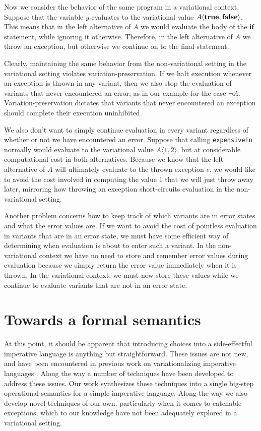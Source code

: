 \documentclass[12pt,oneside]{book}
\newcommand{\tagtree}[3]{#1 \langle #2, #3 \rangle}
\begin{document}
Now we consider the behavior of the same program in a variational context.
Suppose that the variable $y$ evaluates to the variational value
$\tagtree{A}{\CCkeyw{true}}{\CCkeyw{false}}$. This means that in the left alternative of $A$ we
would evaluate the body of the $\textbf{\textup{\textrm{if}}}$ statement, while ignoring it otherwise. Therefore,
in the left alternative of $A$ we throw an exception, but otherwise we continue on to the
final statement.

Clearly, maintaining the same behavior from the non-variational setting in the variational setting
violates variation-preservation. If we halt execution whenever an exception is
thrown in any variant, then we also stop the evaluation of variants that never encountered an error,
as in our example for the case $\neg A$. Variation-preservation dictates that variants that never encountered
an exception should complete their execution uninhibited.

We also don't want to simply continue evaluation
in every variant regardless of whether or not we have encountered an error.
Suppose that calling \texttt{expensiveFn} normally would evaluate to the variational value $\tagtree{A}{1}{2}$, but at considerable computational cost in both alternatives.
Because we know that the left alternative of $A$ will ultimately evaluate to the thrown exception $e$, we would
like to avoid the cost involved in computing the value $1$ that we will just throw away later, mirroring how throwing an exception short-circuits evaluation in the
non-variational setting. 

Another problem concerns how to keep track of which variants are in error states and what
the error values are. If we want to avoid the cost of pointless evaluation in variants that are in an error
state, we must have some efficient way of determining when evaluation is about to enter such a variant.
In the non-variational context we have no need to store and remember error values during evaluation
because we simply return the error value immediately when it is thrown. In the variational context, we
must now store these values while we continue to evaluate variants that are not in an error state.

\section{Towards a formal semantics}

At this point, it should be apparent that introducing choices into a side-effectful imperative language
is anything but straightforward. These issues are not new, and have been encountered in previous
work on variationalizing imperative languages \cite{varwhile,varex,varexj}. Along the way a number of
techniques have been developed to address these issues. Our work synthesizes these techniques into
a single big-step operational semantics for a simple imperative language. Along the way we also develop
novel techniques of our own, particularly when it comes to catchable exceptions, which to our knowledge
have not been adequately explored in a variational setting.
\end{document}
